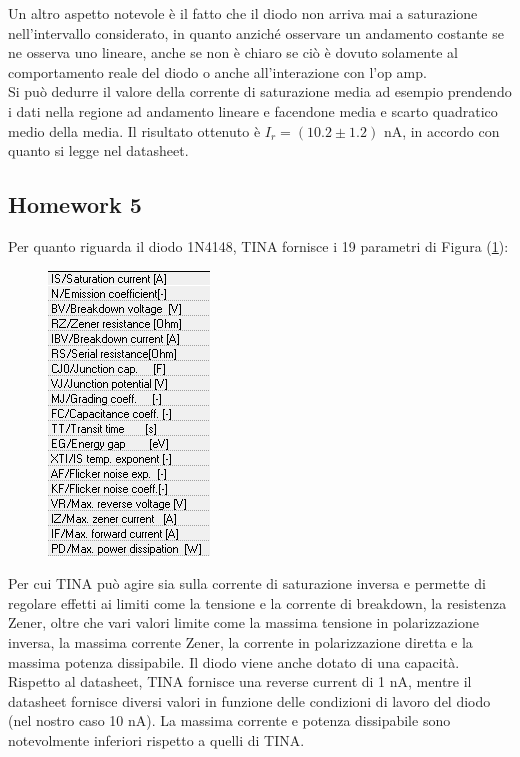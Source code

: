 \documentclass[journal, a4paper]{IEEEtran}
\begin{document}
Un altro aspetto notevole è il fatto che il diodo non arriva mai a saturazione nell'intervallo considerato, in quanto anziché osservare un andamento costante se ne osserva uno lineare, anche se non è chiaro se ciò è dovuto solamente al comportamento reale del diodo o anche all'interazione con l'op amp.\\
Si può dedurre il valore della corrente di saturazione media ad esempio prendendo i dati nella regione ad andamento lineare e facendone media e scarto quadratico medio della media. Il risultato ottenuto è $I_r = (10.2 \pm 1.2)$ nA, in accordo con quanto si legge nel datasheet.\\

\subsection{Homework 5}

Per quanto riguarda il diodo 1N4148, TINA fornisce i 19 parametri di Figura (\ref{dati_Tina}):\\

\begin{figure}[htp]
\caption{}
\label{dati_Tina}
\centering
\includegraphics[scale=.7]{dati_Tina}
\end{figure}


Per cui TINA può agire sia sulla corrente di saturazione inversa e permette di regolare effetti ai limiti come la tensione e la corrente di breakdown, la resistenza Zener, oltre che vari valori limite come la massima tensione in polarizzazione inversa, la massima corrente Zener, la corrente in polarizzazione diretta e la massima potenza dissipabile. Il diodo viene anche dotato di una capacità. Rispetto al datasheet, TINA fornisce una reverse current di 1 nA, mentre il datasheet fornisce diversi valori in funzione delle condizioni di lavoro del diodo (nel nostro caso 10 nA). La massima corrente e potenza dissipabile sono notevolmente inferiori rispetto a quelli di TINA.\\
\end{document}
